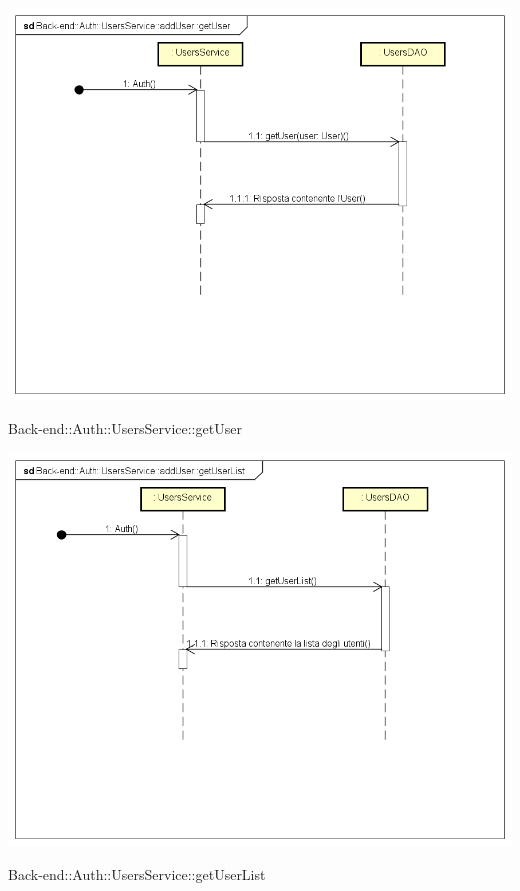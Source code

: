 \includegraphics[width=\textwidth,height=\textheight,keepaspectratio]{images/diagrams/back-end/Ufficial_Backend/Back-end__Auth__UsersService__getUser.png} 	\caption{Back-end::Auth::UsersService::getUser}
\includegraphics[width=\textwidth,height=\textheight,keepaspectratio]{images/diagrams/back-end/Ufficial_Backend/Back-end__Auth__UsersService__getUserList.png} 	\caption{Back-end::Auth::UsersService::getUserList}
